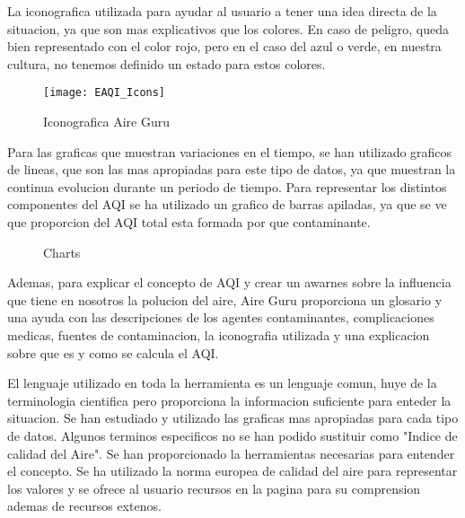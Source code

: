 La iconografica utilizada para ayudar al usuario a tener una idea directa de la situacion, ya que son mas 
explicativos que los colores. En caso de peligro, queda bien representado con el color rojo, pero en el caso del azul o verde, en nuestra cultura, no
tenemos definido un estado para estos colores.\\
\begin{figure}[ht]
    \centering
    \texttt{[image: EAQI\_Icons]}
    \caption{Iconografica Aire Guru}
\end{figure}

Para las graficas que muestran variaciones en el tiempo, se han utilizado graficos de lineas, que son las mas apropiadas para este tipo de datos,
ya que muestran la continua evolucion durante un periodo de tiempo. Para representar los distintos componentes del AQI se ha utilizado un
grafico de barras apiladas, ya que se ve que proporcion del AQI total esta formada por que contaminante.\\
\begin{figure}[ht]
    \centering
     \hfill
 
    \caption{Charts}
\end{figure}

Ademas, para explicar el concepto de AQI y crear un awarnes sobre la influencia que tiene en nosotros la polucion del aire, Aire Guru proporciona un 
glosario y una ayuda con las descripciones de los agentes contaminantes, complicaciones medicas, fuentes de contaminacion, la iconografia utilizada y
una explicacion sobre que es y como se calcula el AQI.\\

 
\begin{itemize}
    \done El lenguaje utilizado en toda la herramienta es un lenguaje comun, huye de la terminologia cientifica pero proporciona la informacion
    suficiente para enteder la situacion.
    \done Se han estudiado y utilizado las graficas mas apropiadas para cada tipo de datos.
    \crossed Algunos terminos especificos no se han podido sustituir como "Indice de calidad del Aire".
    \done Se han proporcionado la herramientas necesarias para entender el concepto. Se ha utilizado la norma europea de calidad del aire para 
    representar los valores y se ofrece al usuario recursos en la pagina para su comprension ademas de recursos extenos.
    
\end{itemize}
 

\newpage